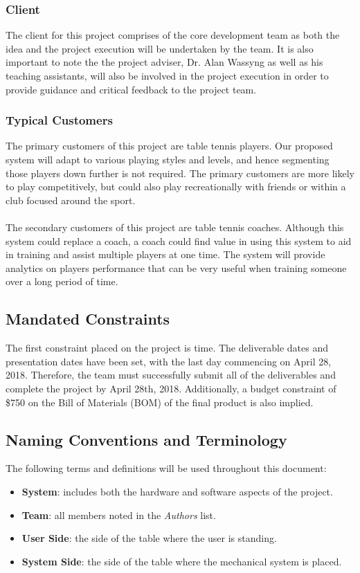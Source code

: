 \documentclass[11pt]{article}
\begin{document}
\subsubsection{Client}
The client for this project comprises of the core development team as both the idea and the project execution will be undertaken by the team. It is also important to note the the project adviser, Dr. Alan Wassyng as well as his teaching assistants, will also be involved in the project execution in order to provide guidance and critical feedback to the project team.
\subsubsection{Typical Customers}
The primary customers of this project are table tennis players. Our proposed system will adapt to various playing styles and levels, and hence segmenting those players down further is not required. The primary customers are more likely to play competitively, but could also play recreationally with friends or within a club focused around the sport. \\\\
The secondary customers of this project are table tennis coaches. Although this system could replace a coach, a coach could find value in using this system to aid in training and assist multiple players at one time. The system will provide analytics on players performance that can be very useful when training someone over a long period of time.
\subsection{Mandated Constraints}
The first constraint placed on the project is time. The deliverable dates and presentation dates have been set, with the last day commencing on April 28, 2018. Therefore, the team must successfully submit all of the deliverables and complete the project by April 28th, 2018. Additionally, a budget constraint of \$750 on the Bill of Materials (BOM) of the final product is also implied.
\subsection{Naming Conventions and Terminology}
The following terms and definitions will be used throughout this document:
\begin{itemize}
\item \textbf{System}: includes both the hardware and software aspects of the project.
\item \textbf{Team}: all members noted in the \textit{Authors} list.
\item \textbf{User Side}: the side of the table where the user is standing.
\item \textbf{System Side}: the side of the table where the mechanical system is placed.
\end{itemize}
\end{document}
